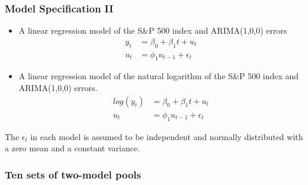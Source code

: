 \begin{frame}
    \frametitle{Model Specification II}

    \begin{itemize}
    \item A linear regression model of the S\&P 500 index and ARIMA(1,0,0) errors
        \begin{align*}
        y_t &= \beta_0 + \beta_1 t + u_t \\
        u_t &= \phi_1 u_{t-1} + \epsilon_t
        \end{align*}

    \item A linear regression model of the natural logarithm of the S\&P 500 index and ARIMA(1,0,0) errors.
        \begin{align*}
        log(y_t) &= \beta_0 + \beta_1 t + u_t \\
        u_t &= \phi_1 u_{t-1} + \epsilon_t
        \end{align*}
    \end{itemize}

\small{The $\epsilon_t$ in each model is assumed to be independent and normally distributed with a zero mean and a constant variance.}

\end{frame}



\begin{frame}
    \frametitle{Ten sets of two-model pools}

\begin{table}[ht]
  \centering
  \small
  \caption{Log predictive score of density forecasts combination under two-model linear pools}
  \label{tab:2}
\end{table}

\end{frame}




